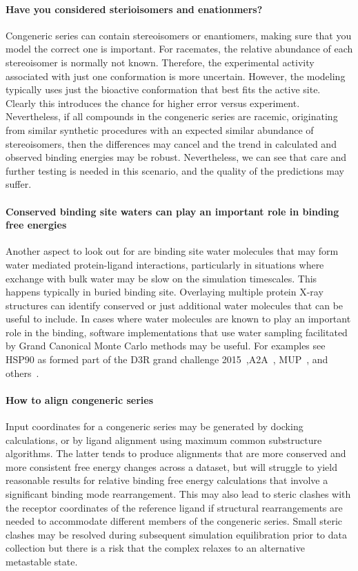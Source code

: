 \documentclass[9pt,bestpractices]{livecoms}
\begin{document}
\paragraph{Have you considered sterioisomers and enationmers?}
Congeneric series can contain stereoisomers or enantiomers, making sure that you model the correct one is important. For racemates, the relative abundance of each stereoisomer is normally not known. Therefore, the experimental activity associated with just one conformation is more uncertain. However, the modeling typically uses just the bioactive conformation that best fits the active site. Clearly this introduces the chance for higher error versus experiment. Nevertheless, if all compounds in the congeneric series are racemic, originating from similar synthetic procedures with an expected similar abundance of stereoisomers, then the differences may cancel and the trend in calculated and observed binding energies may be robust. Nevertheless, we can see that care and further testing is needed in this scenario, and the quality of the predictions may suffer.   

\paragraph{Conserved binding site waters can play an important role in binding free energies}
Another aspect to look out for are binding site water molecules that may form water mediated protein-ligand interactions, particularly in situations where exchange with bulk water may be slow on the simulation timescales. This happens typically in buried binding site. Overlaying multiple protein X-ray structures can identify conserved or just additional water molecules that can be useful to include. In cases where water molecules are known to play an important role in the binding, software implementations that use water sampling facilitated by Grand Canonical Monte Carlo methods may be useful. For examples see HSP90 as formed part of the D3R grand challenge 2015~\cite{mey2016blinded},A2A~\cite{brucemacdonald2018ligand}, MUP~\cite{ross2015water}, and others~\cite{michel2009energetics}.

\paragraph{How to align congeneric series}
Input coordinates for a congeneric series may be generated by docking calculations, or by ligand alignment using maximum common substructure algorithms. The latter tends to produce alignments that are more conserved and more consistent free energy changes across a dataset, but will struggle to yield reasonable results for relative binding free energy calculations that involve a significant binding mode rearrangement. This may also lead to steric clashes with the receptor coordinates of the reference ligand if structural rearrangements are needed to accommodate different members of the congeneric series. Small steric clashes may be resolved during subsequent simulation equilibration prior to data collection but there is a risk that the complex relaxes to an alternative metastable state. 
\end{document}
